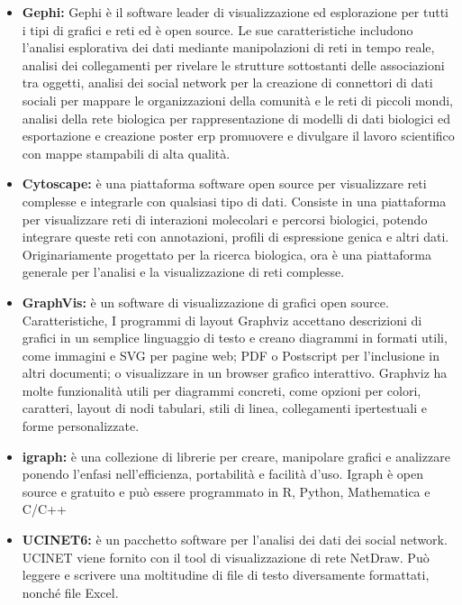 \documentclass[binding=0.6cm]{sapthesis}
\begin{document}
\begin{itemize}
  \item \textbf{Gephi\cite{Gephi2024}:}
  Gephi è il software leader di visualizzazione ed esplorazione per tutti i tipi di grafici e reti ed è open source. Le sue caratteristiche includono
  l'analisi esplorativa dei dati mediante manipolazioni di reti in tempo reale, 
  analisi dei collegamenti per rivelare le strutture sottostanti delle associazioni tra oggetti, 
  analisi dei social network per la creazione di connettori di dati sociali per mappare le organizzazioni della comunità e le reti di piccoli mondi, 
  analisi della rete biologica per rappresentazione di modelli di dati biologici ed esportazione e 
  creazione poster erp promuovere e divulgare il lavoro scientifico con mappe stampabili di alta qualità.
  \item \textbf{Cytoscape\cite{Cytoscape2024}:} è una piattaforma software open source per visualizzare 
  reti complesse e integrarle con qualsiasi tipo di dati. Consiste in una piattaforma per
  visualizzare reti di interazioni molecolari e percorsi biologici, potendo integrare queste reti con annotazioni,
  profili di espressione genica e altri dati. Originariamente progettato per la ricerca biologica, 
  ora è una piattaforma generale per l'analisi e la visualizzazione di reti complesse.
  \item \textbf{GraphVis\cite{Graphviz2024}:} è un software di visualizzazione di grafici open source. Caratteristiche,
  I programmi di layout Graphviz accettano descrizioni di grafici in un semplice linguaggio di testo e creano diagrammi in formati utili, 
  come immagini e SVG per pagine web; PDF o Postscript per l'inclusione in altri documenti; 
  o visualizzare in un browser grafico interattivo. Graphviz ha molte funzionalità utili 
  per diagrammi concreti, come opzioni per colori, caratteri, layout di nodi tabulari, stili di linea, 
  collegamenti ipertestuali e forme personalizzate.
  \item \textbf{igraph\cite{igraph2024}:} è una collezione di librerie per creare, manipolare grafici e analizzare ponendo l'enfasi nell'efficienza,
  portabilità e facilità d'uso. Igraph è open source e gratuito e può essere programmato in R, Python, Mathematica e C/C++
  \item \textbf{UCINET6\cite{UCINET2024}:} è un pacchetto software per l'analisi dei dati dei social network. UCINET viene fornito con il tool di visualizzazione di rete NetDraw.
  Può leggere e scrivere una moltitudine di file di testo diversamente formattati, nonché file Excel. 

\end{itemize}
\end{document}
